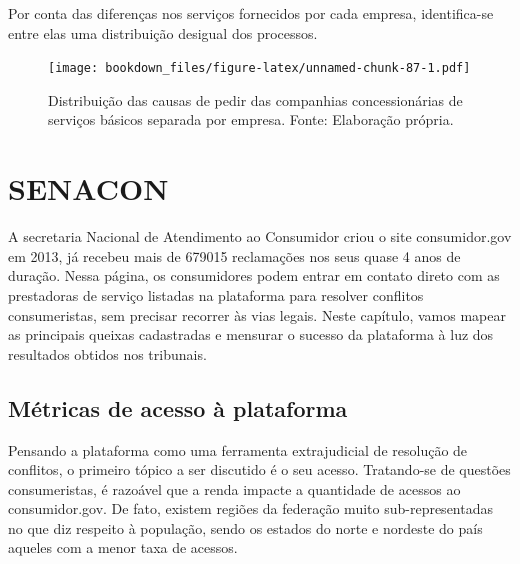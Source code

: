\documentclass[]{report}
\begin{document}
Por conta das diferenças nos serviços fornecidos por cada empresa,
identifica-se entre elas uma distribuição desigual dos processos.

\begin{figure}[htbp]
\centering
\texttt{[image: bookdown\_files/figure-latex/unnamed-chunk-87-1.pdf]}
\caption{\label{fig:unnamed-chunk-87}Distribuição das causas de pedir das
companhias concessionárias de serviços básicos separada por empresa.
Fonte: Elaboração própria.}
\end{figure}

\section{SENACON}\label{results-senacon}

A secretaria Nacional de Atendimento ao Consumidor criou o site
consumidor.gov em 2013, já recebeu mais de 679015 reclamações nos seus
quase 4 anos de duração. Nessa página, os consumidores podem entrar em
contato direto com as prestadoras de serviço listadas na plataforma para
resolver conflitos consumeristas, sem precisar recorrer às vias legais.
Neste capítulo, vamos mapear as principais queixas cadastradas e
mensurar o sucesso da plataforma à luz dos resultados obtidos nos
tribunais.

\subsection{Métricas de acesso à
plataforma}\label{metricas-de-acesso-a-plataforma}

Pensando a plataforma como uma ferramenta extrajudicial de resolução de
conflitos, o primeiro tópico a ser discutido é o seu acesso. Tratando-se
de questões consumeristas, é razoável que a renda impacte a quantidade
de acessos ao consumidor.gov. De fato, existem regiões da federação
muito sub-representadas no que diz respeito à população, sendo os
estados do norte e nordeste do país aqueles com a menor taxa de acessos.
\end{document}

